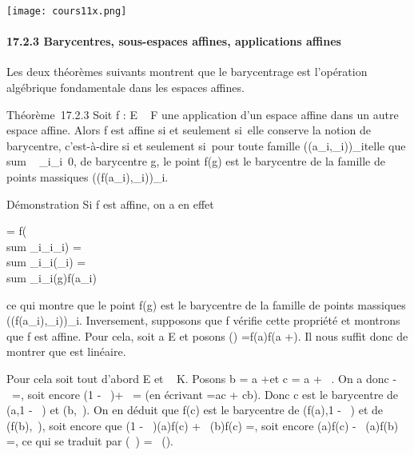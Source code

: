 \documentclass[]{article}
\begin{document}
\texttt{[image: cours11x.png]}

\paragraph{17.2.3 Barycentres, sous-espaces affines, applications
affines}

Les deux théorèmes suivants montrent que le barycentrage est l'opération
algébrique fondamentale dans les espaces affines.

Théorème~17.2.3 Soit f : E \rightarrow~ F une application d'un espace affine dans
un autre espace affine. Alors f est affine si et seulement si~elle
conserve la notion de barycentre, c'est-à-dire si et seulement si~pour
toute famille \left
((a_i,\lambda_i)\right )_i\inI telle que
\\sum ~
_i\inI\lambda_i\neq~0, de barycentre g,
le point f(g) est le barycentre de la famille de points massiques
\left
((f(a_i),\lambda_i)\right )_i\inI.

Démonstration Si f est affine, on a en effet

 =\vec
f(\\sum
_i\inI\lambda_i\overrightarrowga_i)
= \\sum
_i\inI\lambda_i\vecf(\overrightarrowga_i)
= \\sum
_i\inI\lambda_i\overrightarrowf(g)f(a_i)

ce qui montre que le point f(g) est le barycentre de la famille de
points massiques \left
((f(a_i),\lambda_i)\right )_i\inI.
Inversement, supposons que f vérifie cette propriété et montrons que f
est affine. Pour cela, soit a \in E et posons
\vecf(\overrightarrow\xi)
=\overrightarrow f(a)f(a
+\overrightarrow \xi). Il nous suffit donc de montrer
que \vecf est linéaire.

Pour cela soit tout d'abord \overrightarrow\xi
\in\overrightarrow E et \lambda~ \in K. Posons b = a
+\overrightarrow \xi et c = a +
\lambda~\overrightarrow\xi. On a donc
\overrightarrowac -
\lambda~\overrightarrowab =, soit encore (1 - \lambda~)\overrightarrowac +
\lambda~\overrightarrowbc = (en écrivant \overrightarrowab
=\overrightarrow ac +\overrightarrow
cb). Donc c est le barycentre de (a,1 - \lambda~) et (b,\lambda~). On en déduit que
f(c) est le barycentre de (f(a),1 - \lambda~) et de (f(b),\lambda~), soit encore que
(1 - \lambda~)\overrightarrowf(a)f(c) +
\lambda~\overrightarrowf(b)f(c)
=, soit encore
\overrightarrowf(a)f(c) -
\lambda~\overrightarrowf(a)f(b)
=, ce qui se traduit par
\vecf(\lambda~\overrightarrow\xi) =
\lambda~\vecf(\overrightarrow\xi).
\end{document}
